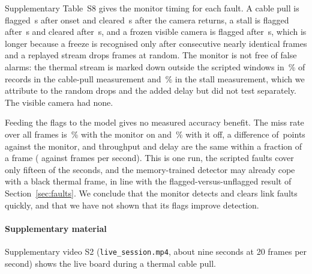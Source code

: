 Supplementary Table~S8 gives the monitor timing for each fault. A cable pull is flagged \livFaultOnUnpluggedDetectS{}\,s after onset and cleared \livFaultOnUnpluggedRecoverS{}\,s after the camera returns, a stall is flagged after \livFaultOnStalledDetectS{}\,s and cleared after \livFaultOnStalledRecoverS{}\,s, and a frozen visible camera is flagged after \livFaultOnFrozenDetectS{}\,s, which is longer because a freeze is recognised only after consecutive nearly identical frames and a replayed stream drops frames at random. The monitor is not free of false alarms: the thermal stream is marked down outside the scripted windows in \livFaultOnUnpluggedFalseAlarmPercent{}\,\% of records in the cable-pull measurement and \livFaultOnStalledFalseAlarmPercent{}\,\% in the stall measurement, which we attribute to the random drops and the added delay but did not test separately. The visible camera had none.

Feeding the flags to the model gives no measured accuracy benefit. The miss rate over all frames is \livFaultOnMr{}\,\% with the monitor on and \livFaultOffMr{}\,\% with it off, a difference of \livFaultMrChange{}\,points against the monitor, and throughput and delay are the same within a fraction of a frame (\livFaultOnFps{} against \livFaultOffFps{} frames per second). This is one run, the scripted faults cover only fifteen of the \cfgLinkSeconds{} seconds, and the memory-trained detector may already cope with a black thermal frame, in line with the flagged-versus-unflagged result of Section~\ref{sec:faults}. We conclude that the monitor detects and clears link faults quickly, and that we have not shown that its flags improve detection.

\paragraph{Supplementary material}
Supplementary video S2 (\texttt{live\_session.mp4}, about nine seconds at 20 frames per second) shows the live board during a thermal cable pull.
